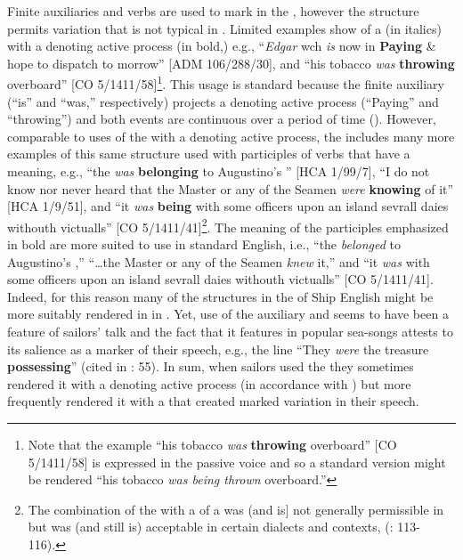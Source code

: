 Finite  auxiliaries and  verbs are used to mark  in the , however the structure permits variation that is not typical in . Limited examples show  of a  (in italics) with a   denoting active process (in bold,) e.g., “\textit{Edgar} wch \textit{is} now in \textbf{Paying} \& hope to dispatch to morrow” [ADM 106/288/30], and “his tobacco \textit{was} \textbf{throwing} overboard” [CO 5/1411/58]\footnote{Note that the example “his tobacco \textit{was} \textbf{throwing} overboard” [CO 5/1411/58] is expressed in the passive voice and so a standard version might be rendered “his tobacco \textit{was being thrown} overboard.”}. This usage is standard because the finite auxiliary (“is” and “was,” respectively) projects a  denoting active process (“Paying” and “throwing”) and both events are continuous over a period of time (\citealt{SILInternational2005}). 
However, comparable to uses of the  with a  denoting active process, the  includes many more examples of this same structure used with participles of verbs that have a  meaning, e.g., “the  \textit{was} \textbf{belonging} to Augustino’s ” [HCA 1/99/7], “I do not know nor never heard that the Master or any of the Seamen \textit{were} \textbf{knowing} of it” [HCA 1/9/51], and “it \textit{was} \textbf{being} with some officers upon an island sevrall daies withouth victualls” [CO 5/1411/41]\footnote{The combination of the  with a  of a   was (and is] not generally permissible in  but was (and still is) acceptable in certain dialects and contexts, (\citealt{Römer2005}: 113-116).}. The  meaning of the participles emphasized in bold are more suited to   use in standard English, i.e., “the  \textit{belonged} to Augustino’s ,” “…the Master or any of the Seamen \textit{knew} it,” and “it \textit{was} with some officers upon an island sevrall daies withouth victualls” [CO 5/1411/41]. Indeed, for this reason many of the  structures in the  of Ship English might be more suitably rendered in   in . Yet, use of the  auxiliary and   seems to have been a feature of sailors’ talk and the fact that it features in popular sea-songs attests to its salience as a marker of their speech, e.g., the line “They \textit{were} the treasure \textbf{possessing}” (cited in \citealt{Palmer1986}: 55). In sum, when sailors used the  they sometimes rendered it with a  denoting active process (in accordance with ) but more frequently rendered it with a   that created marked variation in their speech. 

